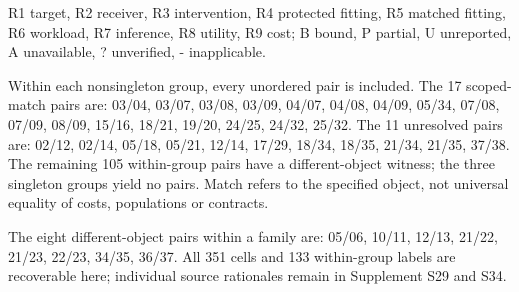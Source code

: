 \begin{table}[t]
\par\smallskip\raggedright R1 target, R2 receiver, R3 intervention, R4 protected fitting, R5 matched fitting, R6 workload, R7 inference, R8 utility, R9 cost; B bound, P partial, U unreported, A unavailable, ? unverified, - inapplicable.\par Within each nonsingleton group, every unordered pair is included. The 17 scoped-match pairs are: \mbox{03/04}, \mbox{03/07}, \mbox{03/08}, \mbox{03/09}, \mbox{04/07}, \mbox{04/08}, \mbox{04/09}, \mbox{05/34}, \mbox{07/08}, \mbox{07/09}, \mbox{08/09}, \mbox{15/16}, \mbox{18/21}, \mbox{19/20}, \mbox{24/25}, \mbox{24/32}, \mbox{25/32}. The 11 unresolved pairs are: \mbox{02/12}, \mbox{02/14}, \mbox{05/18}, \mbox{05/21}, \mbox{12/14}, \mbox{17/29}, \mbox{18/34}, \mbox{18/35}, \mbox{21/34}, \mbox{21/35}, \mbox{37/38}. The remaining 105 within-group pairs have a different-object witness; the three singleton groups yield no pairs. Match refers to the specified object, not universal equality of costs, populations or contracts.
\par The eight different-object pairs within a family are: \mbox{05/06}, \mbox{10/11}, \mbox{12/13}, \mbox{21/22}, \mbox{21/23}, \mbox{22/23}, \mbox{34/35}, \mbox{36/37}. All 351 cells and 133 within-group labels are recoverable here; individual source rationales remain in Supplement S29 and S34.
\end{table}
